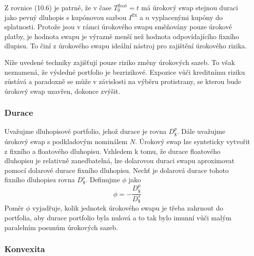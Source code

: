 \documentclass[a4paper]{book}
\begin{document}
Z rovnice (10.6) je patrné, že v čase $T_0^{\mathrm{float}} = t$ má úrokový swap stejnou duraci jako pevný dluhopis s kupónovou sazbou $I^{\mathrm{fix}}$ a $n$ vyplacenými kupóny do splatnosti. Protože jsou v rámci úrokového swapu směňovány pouze úrokové platby, je hodnota swapu je výrazně menší než hodnota odpovídajícího fixního dlupisu. To činí z úrokového swapu ideální nástroj pro zajištění úrokového rizika.

Níže uvedené techniky zajišťují pouze riziko změny úrokových sazeb. To však neznamená, že výsledné portfolio je bezrizikové. Expozice vůči kreditnímu riziku zůstává a paradoxně se může v závislosti na výběru protistrany, se kterou bude úrokový swap uzavřen, dokonce zvýšit.

\subsubsection{Durace}

Uvažujme dluhopisové portfolio, jehož durace je rovna $D_{\$}^p$. Dále uvažujme úrokový swap s podkladovým nominálem $N$. Úrokový swap lze synteticky vytvořit z fixního a floatového dluhopisu. Vzhledem k tomu, že durace floatového dluhopisu je relativně zanedbatelná, lze dolarovou duraci swapu aproximovat pomocí dolarové durace fixního dluhopisu. Nechť je dolarová durace tohoto fixního dluhopisu rovna $D_{\$}^s$. Definujme $\phi$ jako
\begin{equation*}
\phi = - \frac{D_{\$}^p}{D_{\$}^s}
\end{equation*}
Poměr $\phi$ vyjadřuje, kolik jednotek úrokového swapu je třeba zahrnout do portfolia, aby durace portfolio byla nulová a to tak bylo imunní vůči malým paralelním posunům úrokových sazeb.

\subsubsection{Konvexita}
\end{document}
